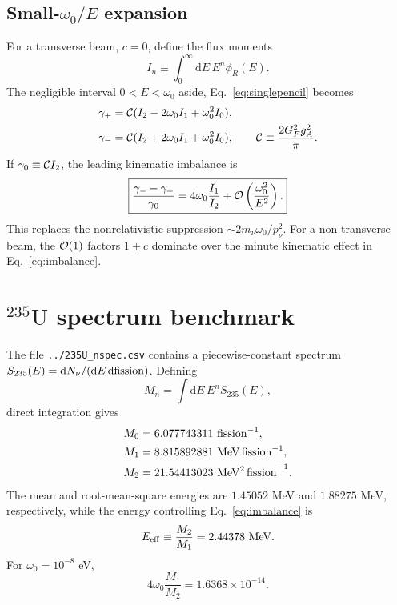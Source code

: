 \documentclass[aps,prd,10pt,onecolumn,nofootinbib,amsmath,amssymb]{revtex4-1}
\newcommand{\dd}{\mathrm{d}}
\begin{document}
\subsection{\texorpdfstring{Small-\(\omega_0/E\) expansion}
{Small-omega0/E expansion}}

For a transverse beam, \(c=0\), define the flux moments
\begin{equation}
 I_n\equiv\int_0^\infty\dd E\,E^n\phi_R(E).
\end{equation}
The negligible interval \(0<E<\omega_0\) aside,
Eq.~\eqref{eq:singlepencil} becomes
\begin{equation}
\begin{aligned}
 \gamma_+&={\cal C}
 (I_2-2\omega_0 I_1+\omega_0^2I_0),\\
 \gamma_-&={\cal C}
 (I_2+2\omega_0 I_1+\omega_0^2I_0),
 \qquad
 {\cal C}\equiv\frac{2G_F^2g_A^2}{\pi}.
\end{aligned}
\label{eq:momentexpansion}
\end{equation}
If \(\gamma_0\equiv{\cal C}I_2\), the leading kinematic imbalance is
\begin{equation}
 \boxed{
 \frac{\gamma_--\gamma_+}{\gamma_0}
 =4\omega_0\frac{I_1}{I_2}
 +{\cal O}\left(\frac{\omega_0^2}{E^2}\right).}
\label{eq:imbalance}
\end{equation}
This replaces the nonrelativistic suppression
\(\sim2m_\nu\omega_0/p_\nu^2\).  For a non-transverse beam, the
\({\cal O}(1)\) factors \(1\pm c\) dominate over the minute kinematic
effect in Eq.~\eqref{eq:imbalance}.

\section{\texorpdfstring{\(^{235}\mathrm{U}\)}{235U} spectrum benchmark}
\label{sec:numeric}

The file \texttt{../235U\_nspec.csv} contains a piecewise-constant spectrum
\(S_{235}(E)=\dd N_{\bar\nu}/(\dd E\,\dd{\rm fission})\).  Defining
\begin{equation}
 M_n=\int\dd E\,E^nS_{235}(E),
\end{equation}
direct integration gives
\begin{equation}
\begin{aligned}
 M_0&=6.077743311~{\rm fission}^{-1},\\
 M_1&=8.815892881~{\rm MeV\,fission}^{-1},\\
 M_2&=21.54413023~{\rm MeV^2\,fission}^{-1}.
\end{aligned}
\label{eq:spectrummoments}
\end{equation}
The mean and root-mean-square energies are \(1.45052\) MeV and
\(1.88275\) MeV, respectively, while the energy controlling
Eq.~\eqref{eq:imbalance} is
\begin{equation}
 E_{\rm eff}\equiv\frac{M_2}{M_1}=2.44378~{\rm MeV}.
\end{equation}
For \(\omega_0=10^{-8}\) eV,
\begin{equation}
 4\omega_0\frac{M_1}{M_2}=1.6368\times10^{-14}.
\end{equation}
\end{document}
